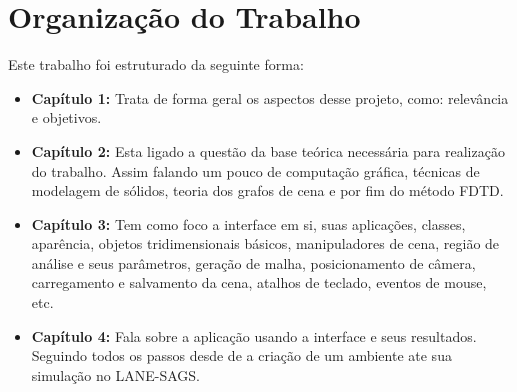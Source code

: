 \section{Organização do Trabalho}
Este trabalho foi estruturado da seguinte forma:
\begin{itemize}
\item \textbf{Capítulo 1:} Trata de forma geral os aspectos desse projeto, como: relevância e objetivos. 
\item \textbf{Capítulo 2:} Esta ligado a questão da base teórica necessária para realização do trabalho. Assim falando um pouco de computação gráfica, técnicas de modelagem de sólidos, teoria dos grafos de cena e por fim do método FDTD.
\item \textbf{Capítulo 3:} Tem como foco a interface em si, suas aplicações, classes, aparência, objetos tridimensionais básicos, manipuladores de cena, região de análise e seus parâmetros, geração de malha, posicionamento de câmera, carregamento e salvamento da cena, atalhos de teclado, eventos de mouse, etc. 
\item \textbf{Capítulo 4:} Fala sobre a aplicação usando a interface e seus resultados. Seguindo todos os 
passos desde de a criação de um ambiente ate sua simulação no LANE-SAGS.
\end{itemize}
